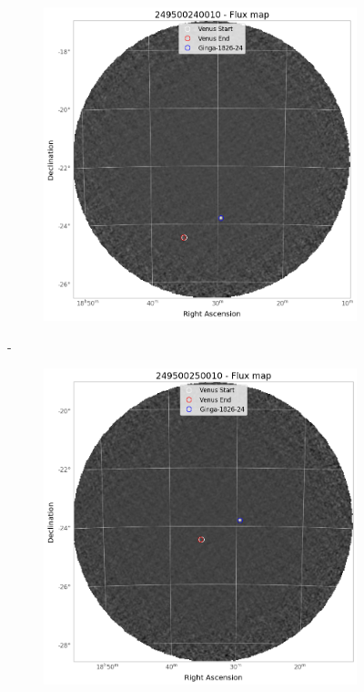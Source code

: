 \documentclass[
	a4paper, %
	10pt, %
	unnumberedsections, %
	twoside, %
]{LTJournalArticle}
\begin{document}
\begin{figure}[H]
        \centering
        \begin{subfigure}{.45\textwidth}
            \includegraphics[width=\textwidth]{report/Figures/methods/2404/24_map.png}
        \end{subfigure}%
        \hspace{1em}-
        \begin{subfigure}{.45\textwidth}
            \centering
            \includegraphics[width=\textwidth]{report/Figures/methods/2404/25_map.png}

\end{subfigure}
\end{figure}
\end{document}
